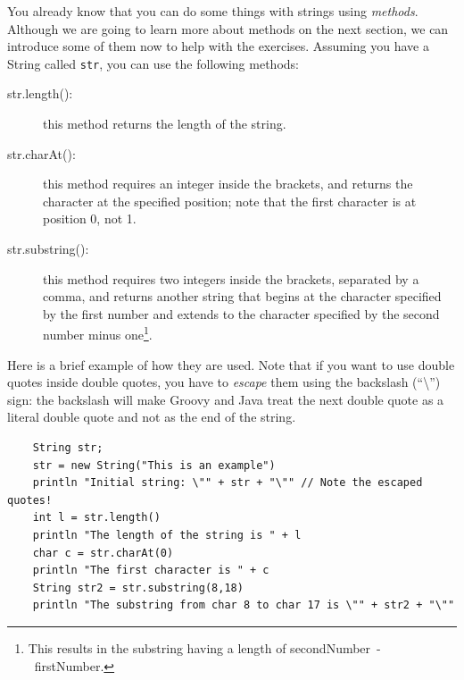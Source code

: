 
% 

You already know that you can do some things with strings using
\emph{methods}. Although we are going to learn more about methods on
the next section, we can introduce some of them now to help with the
exercises. Assuming you have a String called \verb+str+, you can use
the following methods:

\begin{description}
\item[str.length(): ] this method returns the length of the string.
\item[str.charAt(): ] this method requires an integer inside the
  brackets, and returns the character at the specified position;
  note that the first character is at position 0, not 1.
\item[str.substring(): ] this method requires two integers inside the
  brackets, separated by a comma, and returns another string that
  begins at the character specified by the first number and extends to
  the character specified by the second number minus one\footnote{This
  results in the substring having a length of
  secondNumber~-~firstNumber.}.  
\end{description}

Here is a brief example of how they are used. Note that if you want to
use double quotes inside double quotes, you have to \emph{escape} them
using the backslash (``\textbackslash'') sign: the backslash will make
Groovy and Java treat the next double quote as a literal double quote
and not as the end of the string. 

\begin{verbatim}
    String str;
    str = new String("This is an example")
    println "Initial string: \"" + str + "\"" // Note the escaped quotes!
    int l = str.length()
    println "The length of the string is " + l
    char c = str.charAt(0)
    println "The first character is " + c
    String str2 = str.substring(8,18)
    println "The substring from char 8 to char 17 is \"" + str2 + "\""
\end{verbatim}

